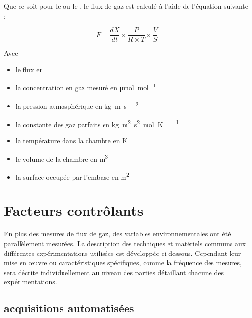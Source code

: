 Que ce soit pour le \coo ou le \chh, le flux de gaz est calculé à l'aide de l'équation suivante : 

\begin{equation}
F = \frac{dX}{dt} \times \frac{P}{R \times T} \times \frac{V}{S}
\end{equation}

Avec : 
\begin{itemize}
\item[F :] le flux en \si{\uml}
\item[X :] la concentration en gaz mesuré en \si{\micro\mole\per\mole}
\item[P :] la pression atmosphérique en \si{\kilo\gram\per\metre\per\square\second}
\item[R :] la constante des gaz parfaits en \si{\kilo\gram\square\metre\per\square\second\per\mole\per\kelvin}
\item[T :] la température dans la chambre en \si{\kelvin}
\item[V :] le volume de la chambre en \si{\cubic\metre}
\item[S :] la surface occupée par l'embase en \si{\square\metre}
\end{itemize}

%
%


\section{Facteurs contrôlants}
En plus des mesures de flux de gaz, des variables environnementales ont été parallèlement mesurées.
La description des techniques et matériels communs aux différentes expérimentations utilisées est développée ci-dessous.
Cependant leur mise en œuvre ou caractéristiques spécifiques, comme la fréquence des mesures, sera décrite individuellement au niveau des parties détaillant chacune des expérimentations.

\subsection{acquisitions automatisées}

